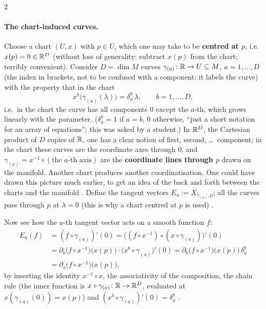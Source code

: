 \begin{paracol}{2}
\paragraph{The chart-induced curves.} Choose a chart $(U,x)$ with $p\in U$, which one may take to be \textbf{centred at $p$}, i.e.\ $x(p)=0\in\mathbb{R}^D$ (without loss of generality: subtract $x(p)$ from the chart; terribly convenient). Consider $D=\dim M$ curves $\gamma_{(a)}\colon\mathbb{R}\to U\subseteq M$, $a=1,\dots,D$ (the index in brackets,
not to be confused with a component: it labels the curve) with the property that in the chart
\[
  x^b\bigl(\gamma_{(a)}(\lambda)\bigr)=\delta^b_a\,\lambda,\qquad b=1,\dots,D,
\]
i.e.\ in the chart the curve has all components $0$ except the $a$-th, which grows linearly with the parameter. ($\delta^b_a=1$ if $a=b$, $0$ otherwise, ``just a short notation for an array of equations''; this was asked by a student.) In $\mathbb{R}^D$, the Cartesian product of $D$ copies of $\mathbb{R}$, one has a clear notion of first, second, \dots\ component;
in the chart these curves are the coordinate axes through $0$, and $\gamma_{(a)}=x^{-1}\circ(\text{the $a$-th axis})$ are the \textbf{coordinate lines through $p$} drawn on the manifold. Another chart produces another coordinatisation. One could have drawn this picture much earlier, to get an idea of the back and forth between the charts and the manifold
     .
Define the tangent vectors $E_a:=X_{\gamma_{(a)},p}$; all the curves pass through $p$ at $\lambda=0$ (this is why a chart centred at $p$ is used)    .

Now see how the $a$-th tangent vector acts on a smooth function $f$:
\begin{align*}
E_a(f)&=(f\circ\gamma_{(a)})'(0)=\bigl((f\circ x^{-1})\circ(x\circ\gamma_{(a)})\bigr)'(0)\\
&=\partial_b\bigl(f\circ x^{-1}\bigr)\bigl(x(p)\bigr)\cdot\bigl(x^b\circ\gamma_{(a)}\bigr)'(0)=\partial_b\bigl(f\circ x^{-1}\bigr)\bigl(x(p)\bigr)\,\delta^b_a\\
&=\partial_a\bigl(f\circ x^{-1}\bigr)\bigl(x(p)\bigr),
\end{align*}
by inserting the identity $x^{-1}\circ x$, the associativity of the composition, the chain rule (the inner function is $x\circ\gamma_{(a)}\colon\mathbb{R}\to\mathbb{R}^D$, evaluated at $x(\gamma_{(a)}(0))=x(p)$) and $(x^b\circ\gamma_{(a)})'(0)=\delta^b_a$
     .


\end{paracol}
